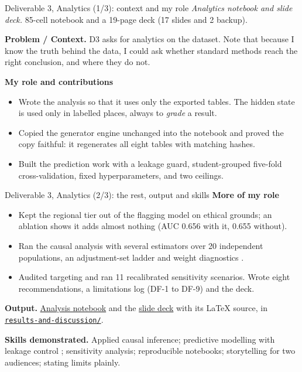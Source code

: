 \documentclass[aspectratio=169,11pt,t]{beamer}
\newcommand{\pfield}[1]{{\sffamily\bfseries\color{eskteal}#1}}
\newcommand{\repo}{https://github.com/machew-b/Student-Retention-Synthetic-Data-Generator}
\newcommand{\gh}[2]{\href{\repo/#1}{#2}}
\begin{document}
\begin{frame}{Deliverable 3, Analytics (1/3): context and my role}
  \small
  {\itshape Analytics notebook and slide deck.} 85-cell notebook and a
  19-page deck (17 slides and 2 backup).
  \medskip

  \pfield{Problem / Context.} D3 asks for analytics on the dataset. Note that because I know the truth behind the data, I could ask whether
  standard methods reach the right conclusion, and where they do not.
  \medskip

  \pfield{My role and contributions}
  \begin{itemize}\setlength\itemsep{2pt}
    \item Wrote the analysis so that it uses only the exported tables. The hidden state
          is used only in labelled places, always to \emph{grade} a result.
    \item Copied the generator engine unchanged into the notebook and proved the copy
          faithful: it regenerates all eight tables with matching hashes.
    \item Built the prediction work with a leakage guard, student-grouped five-fold
          cross-validation, fixed hyperparameters, and two ceilings.
  \end{itemize}
\end{frame}

\begin{frame}{Deliverable 3, Analytics (2/3): the rest, output and skills}
  \small
  \pfield{More of my role}
  \begin{itemize}\setlength\itemsep{2pt}
    \item Kept the regional tier out of the flagging model on ethical grounds; an
          ablation shows it adds almost nothing (AUC 0.656 with it, 0.655 without).
    \item Ran the causal analysis with several estimators over 20 independent
          populations, an adjustment-set ladder and weight diagnostics
          \citep{peters2017,gelman2020ros}.
    \item Audited targeting and ran 11 recalibrated sensitivity scenarios. Wrote eight
          recommendations, a limitations log (DF-1 to DF-9) and the deck.
  \end{itemize}
  \medskip

  \pfield{Output.}
  \gh{blob/main/results-and-discussion/student-retention-analytics.ipynb}{Analysis notebook}
  and the \gh{blob/main/results-and-discussion/student-retention-results-slides.pdf}{slide deck}
  with its LaTeX source, in \gh{tree/main/results-and-discussion}{\texttt{results-and-discussion/}}.
  \medskip

  \pfield{Skills demonstrated.} Applied causal inference; predictive modelling with leakage
  control \citep{james2013}; sensitivity analysis; reproducible notebooks; storytelling for
  two audiences; stating limits plainly.
\end{frame}
\end{document}
